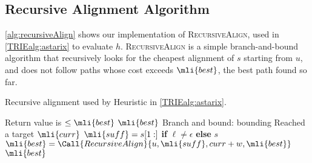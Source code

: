 \subsection{Recursive Alignment Algorithm} \label{app:recursive-align}
\cref{alg:recursiveAlign} shows our implementation of \textsc{RecursiveAlign},
used in \cref{TRIEalg:astarix} to evaluate $h$. \textsc{RecursiveAlign} is a simple
branch-and-bound algorithm that recursively looks for the cheapest alignment of
$s$ starting from $u$, and does not follow paths whose cost exceeds
$\mli{best}$, the best path found so far.

\begin{algorithm}[t]
	\caption{Recursive alignment used by Heuristic in \cref{TRIEalg:astarix}.}\label{alg:recursiveAlign}
	\begin{algorithmic}[1]
		\Statex
			 \Comment
			Return value is $\leq \mli{best}$
				\State \Return $\mli{best}$
				\Comment Branch and bound: bounding
			\EndIf
				\Comment Reached a target
				\State \Return $\mli{curr}$
			\EndIf
				\State $\mli{suff} = s[1:]$ \textbf{if} $\ell \neq \epsilon$ \textbf{else} $s$
				\State $\mli{best} = \Call{RecursiveAlign}{u, \mli{suff}, curr + w, \mli{best}}$
			\EndFor
			\State \Return $\mli{best}$
		\EndFunction
	\end{algorithmic}
\end{algorithm}

